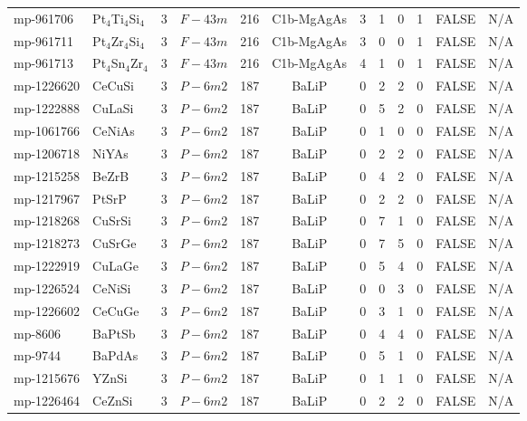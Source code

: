 {\begin{longtable}{llcccccccccc}
    mp-961706 & Pt$_{4}$Ti$_{4}$Si$_{4}$ & 3     & $F-43m$ & 216   & C1b-MgAgAs & 3     & 1     & 0     & 1     & FALSE & N/A \\
    mp-961711 & Pt$_{4}$Zr$_{4}$Si$_{4}$ & 3     & $F-43m$ & 216   & C1b-MgAgAs & 3     & 0     & 0     & 1     & FALSE & N/A \\
    mp-961713 & Pt$_{4}$Sn$_{4}$Zr$_{4}$ & 3     & $F-43m$ & 216   & C1b-MgAgAs & 4     & 1     & 0     & 1     & FALSE & N/A \\
    mp-1226620 & CeCuSi & 3     & $P-6m2$ & 187   & BaLiP & 0     & 2     & 2     & 0     & FALSE & N/A \\
    mp-1222888 & CuLaSi & 3     & $P-6m2$ & 187   & BaLiP & 0     & 5     & 2     & 0     & FALSE & N/A \\
    mp-1061766 & CeNiAs & 3     & $P-6m2$ & 187   & BaLiP & 0     & 1     & 0     & 0     & FALSE & N/A \\
    mp-1206718 & NiYAs & 3     & $P-6m2$ & 187   & BaLiP & 0     & 2     & 2     & 0     & FALSE & N/A \\
    mp-1215258 & BeZrB & 3     & $P-6m2$ & 187   & BaLiP & 0     & 4     & 2     & 0     & FALSE & N/A \\
    mp-1217967 & PtSrP & 3     & $P-6m2$ & 187   & BaLiP & 0     & 2     & 2     & 0     & FALSE & N/A \\
    mp-1218268 & CuSrSi & 3     & $P-6m2$ & 187   & BaLiP & 0     & 7     & 1     & 0     & FALSE & N/A \\
    mp-1218273 & CuSrGe & 3     & $P-6m2$ & 187   & BaLiP & 0     & 7     & 5     & 0     & FALSE & N/A \\
    mp-1222919 & CuLaGe & 3     & $P-6m2$ & 187   & BaLiP & 0     & 5     & 4     & 0     & FALSE & N/A \\
    mp-1226524 & CeNiSi & 3     & $P-6m2$ & 187   & BaLiP & 0     & 0     & 3     & 0     & FALSE & N/A \\
    mp-1226602 & CeCuGe & 3     & $P-6m2$ & 187   & BaLiP & 0     & 3     & 1     & 0     & FALSE & N/A \\
    mp-8606 & BaPtSb & 3     & $P-6m2$ & 187   & BaLiP & 0     & 4     & 4     & 0     & FALSE & N/A \\
    mp-9744 & BaPdAs & 3     & $P-6m2$ & 187   & BaLiP & 0     & 5     & 1     & 0     & FALSE & N/A \\
    mp-1215676 & YZnSi & 3     & $P-6m2$ & 187   & BaLiP & 0     & 1     & 1     & 0     & FALSE & N/A \\
    mp-1226464 & CeZnSi & 3     & $P-6m2$ & 187   & BaLiP & 0     & 2     & 2     & 0     & FALSE & N/A \\

\end{longtable}}
